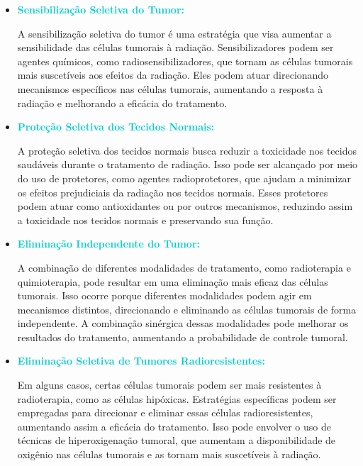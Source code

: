 \documentclass[11pt,a4paper]{article}
\begin{document}
	\begin{itemize}[label=\textcolor{CarnationPink}{$\blacktriangleright$}]
		\item \textcolor{DarkTurquoise}{\textbf{Sensibilização Seletiva do Tumor:}} 
		
		A sensibilização seletiva do tumor é uma estratégia que visa aumentar a sensibilidade das células tumorais à radiação. Sensibilizadores podem ser agentes químicos, como radiosensibilizadores, que tornam as células tumorais mais suscetíveis aos efeitos da radiação. Eles podem atuar direcionando mecanismos específicos nas células tumorais, aumentando a resposta à radiação e melhorando a eficácia do tratamento.

		\item \textcolor{DarkTurquoise}{\textbf{Proteção Seletiva dos Tecidos Normais:}} 
		
		A proteção seletiva dos tecidos normais busca reduzir a toxicidade nos tecidos saudáveis durante o tratamento de radiação. Isso pode ser alcançado por meio do uso de protetores, como agentes radioprotetores, que ajudam a minimizar os efeitos prejudiciais da radiação nos tecidos normais. Esses protetores podem atuar como antioxidantes ou por outros mecanismos, reduzindo assim a toxicidade nos tecidos normais e preservando sua função.

		\item \textcolor{DarkTurquoise}{\textbf{Eliminação Independente do Tumor:}}
		
		A combinação de diferentes modalidades de tratamento, como radioterapia e quimioterapia, pode resultar em uma eliminação mais eficaz das células tumorais. Isso ocorre porque diferentes modalidades podem agir em mecanismos distintos, direcionando e eliminando as células tumorais de forma independente. A combinação sinérgica dessas modalidades pode melhorar os resultados do tratamento, aumentando a probabilidade de controle tumoral.

		\item \textcolor{DarkTurquoise}{\textbf{Eliminação Seletiva de Tumores Radioresistentes:}}
		
		Em alguns casos, certas células tumorais podem ser mais resistentes à radioterapia, como as células hipóxicas. Estratégias específicas podem ser empregadas para direcionar e eliminar essas células radioresistentes, aumentando assim a eficácia do tratamento. Isso pode envolver o uso de técnicas de hiperoxigenação tumoral, que aumentam a disponibilidade de oxigênio nas células tumorais e as tornam mais suscetíveis à radiação.


\end{itemize}
\end{document}
